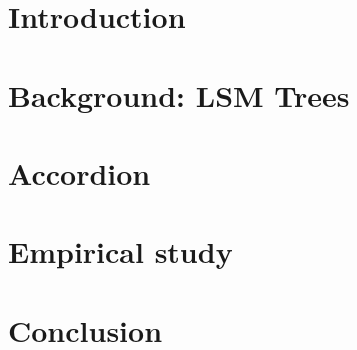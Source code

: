 \documentclass[letterpaper,twocolumn,10pt]{article}
\newcommand{\remove}[1]{}
\newcommand{\sys}{Accordion}
\begin{document}
\remove{
Distributed NoSQL data stores are now ubiquitously used for a wide range of Internet-scale applications, 
including search indexing, analytics, user data management, messaging, advertizing, online trading, and much much more.
Such data stores are commonly organized as  log-structured merge (LSM) trees, 
which  


This paper  reports on our experience in improving the memory organization of the popular 
Apache HBase LSM-based NoSQL store. 
We present \sys, a new memory management scheme for LSM trees, which we have implemented and 
committed in HBase 2.0.
\sys\ reduces the size of the data structure holding the 
 top LSM level, namely, the dynamic memory component that absorbs writes, and utilizes the remainging 
RAM capacity to store flat static data. This  saves space and also reduces  memory management overhead (garbage collection, etc.). 
In addition, \sys\ allows for in-memory compactions (of the flat data), whereas existing LSM-based stores compact only on-disk data. 
\sys\ thus produces  fewer disk writes, which reduces disk wear as well as disk compactions. 

Perhaps surprisingly, our experiments show that memory management overhead is a more significant bottleneck than disk I/O in a
wide range of deployments and workloads, and hence \sys\ reaps more performance benefits from flattening than from in-memory compactions,
while the latter is important for extending disk lifes.
}


\section{Introduction} \label{sec:intro}
 


\section{Background: LSM Trees} \label{sec:background}
 

\section{\sys} \label{sec:accordion}
 

\section{Empirical study} \label{sec:eval}


\section{Conclusion} \label{sec:conclusions}



\newpage




\end{document}
